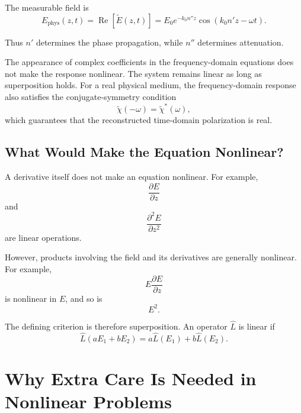 \documentclass[11pt]{article}
\begin{document}
The measurable field is
\begin{equation}
E_{\mathrm{phys}}(z,t)
=
\operatorname{Re}\!\left[\tilde{E}(z,t)\right]
=
E_0
e^{-k_0n''z}
\cos\!\left(k_0n'z-\omega t\right).
\end{equation}

Thus \(n'\) determines the phase propagation, while \(n''\) determines attenuation.

The appearance of complex coefficients in the frequency-domain equations does not make the response nonlinear.  The system remains linear as long as superposition holds.  For a real physical medium, the frequency-domain response also satisfies the conjugate-symmetry condition
\begin{equation}
\tilde{\chi}(-\omega)
=
\tilde{\chi}^{*}(\omega),
\end{equation}
which guarantees that the reconstructed time-domain polarization is real.

\subsection{What Would Make the Equation Nonlinear?}

A derivative itself does not make an equation nonlinear.  For example,
\begin{equation}
\frac{\partial E}{\partial z}
\end{equation}
and
\begin{equation}
\frac{\partial^2 E}{\partial z^2}
\end{equation}
are linear operations.

However, products involving the field and its derivatives are generally nonlinear.  For example,
\begin{equation}
E\frac{\partial E}{\partial z}
\end{equation}
is nonlinear in \(E\), and so is
\begin{equation}
E^2.
\end{equation}

The defining criterion is therefore superposition.  An operator \(\hat{L}\) is linear if
\begin{equation}
\boxed{
\hat{L}(aE_1+bE_2)
=
a\hat{L}(E_1)
+
b\hat{L}(E_2)
}.
\end{equation}

\section{Why Extra Care Is Needed in Nonlinear Problems}
\end{document}

